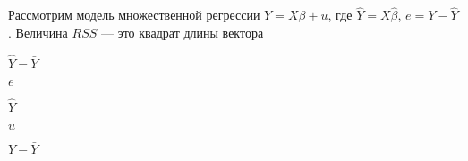 
\begin{question}
Рассмотрим модель множественной регрессии \(Y=X\beta+u\), где \(\hat Y = X\hat\beta\), \(e=Y-\hat Y\).
Величина \(RSS\) --- это квадрат длины вектора
\begin{answerlist}
  \item \(\hat Y - \bar Y\)
  \item \(e\)
  \item \(\hat Y\)
  \item \(u\)
  \item \(Y-\bar Y\)
\end{answerlist}
\end{question}


